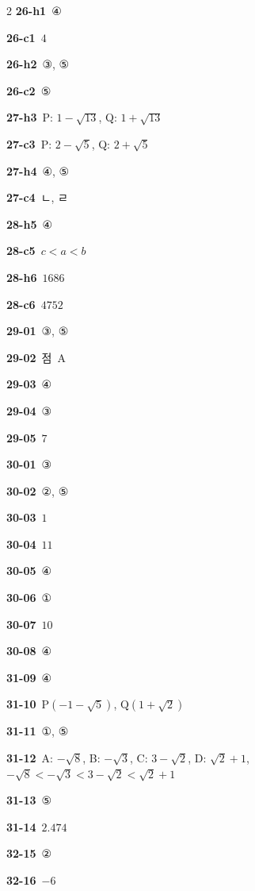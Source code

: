 \documentclass[10pt,a4paper]{article}
\newcommand{\pt}[1]{\mathrm{#1}}
\begin{document}
\begin{multicols}{2}
\noindent\textbf{26-h1}\ ④\par
\noindent\textbf{26-c1}\ $4$\par
\noindent\textbf{26-h2}\ ③, ⑤\par
\noindent\textbf{26-c2}\ ⑤\par
\noindent\textbf{27-h3}\ P: $1-\sqrt{13}$, Q: $1+\sqrt{13}$\par
\noindent\textbf{27-c3}\ P: $2-\sqrt{5}$, Q: $2+\sqrt{5}$\par
\noindent\textbf{27-h4}\ ④, ⑤\par
\noindent\textbf{27-c4}\ ㄴ, ㄹ\par
\noindent\textbf{28-h5}\ ④\par
\noindent\textbf{28-c5}\ $c<a<b$\par
\noindent\textbf{28-h6}\ $1686$\par
\noindent\textbf{28-c6}\ $4752$\par
\noindent\textbf{29-01}\ ③, ⑤\par
\noindent\textbf{29-02}\ 점~$\pt{A}$\par
\noindent\textbf{29-03}\ ④\par
\noindent\textbf{29-04}\ ③\par
\noindent\textbf{29-05}\ $7$\par
\noindent\textbf{30-01}\ ③\par
\noindent\textbf{30-02}\ ②, ⑤\par
\noindent\textbf{30-03}\ $1$\par
\noindent\textbf{30-04}\ $11$\par
\noindent\textbf{30-05}\ ④\par
\noindent\textbf{30-06}\ ①\par
\noindent\textbf{30-07}\ $10$\par
\noindent\textbf{30-08}\ ④\par
\noindent\textbf{31-09}\ ④\par
\noindent\textbf{31-10}\ $\pt{P}(-1-\sqrt{5})$, $\pt{Q}(1+\sqrt{2})$\par
\noindent\textbf{31-11}\ ①, ⑤\par
\noindent\textbf{31-12}\ A: $-\sqrt{8}$, B: $-\sqrt{3}$, C: $3-\sqrt{2}$, D: $\sqrt{2}+1$, $-\sqrt{8}<-\sqrt{3}<3-\sqrt{2}<\sqrt{2}+1$\par
\noindent\textbf{31-13}\ ⑤\par
\noindent\textbf{31-14}\ $2.474$\par
\noindent\textbf{32-15}\ ②\par
\noindent\textbf{32-16}\ $-6$\par

\end{multicols}
\end{document}
